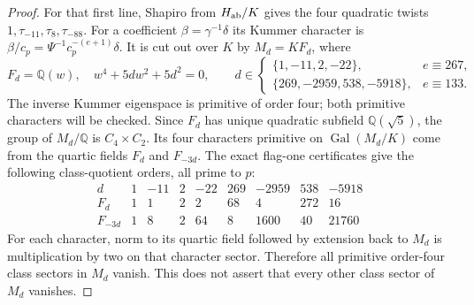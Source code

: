 \begin{proof}
For that first line, Shapiro from $H_{\rm ab}/K$ gives the four
quadratic twists $1,\tau_{-11},\tau_8,\tau_{-88}$.
For a coefficient $\beta=\gamma^{-1}\delta$ its Kummer character
is $\beta/c_p=\Psi^{-1}c_p^{-(e+1)}\delta$.
It is cut out over $K$ by $M_d=KF_d$, where
\[
 F_d=\mathbb Q(w),\quad w^4+5dw^2+5d^2=0,\qquad
 d\in\begin{cases}
 \{1,-11,2,-22\},&e\equiv267,\\
 \{269,-2959,538,-5918\},&e\equiv133.
 \end{cases} \tag{G140.17}
\]
The inverse Kummer eigenspace is primitive of order four;
both primitive characters will be checked.  Since $F_d$ has
unique quadratic subfield $\mathbb Q(\sqrt5)$, the group of
$M_d/\mathbb Q$ is $C_4\times C_2$.
Its four characters primitive on $\operatorname{Gal}(M_d/K)$
come from the quartic fields $F_d$ and $F_{-3d}$.
The exact flag-one certificates give the following class-quotient
orders, all prime to $p$:
\[
\begin{array}{c|rrrrrrrr}
d&1&-11&2&-22&269&-2959&538&-5918\\\hline
F_d&1&1&2&2&68&4&272&16\\
F_{-3d}&1&8&2&64&8&1600&40&21760
\end{array} \tag{G140.18}
\]
For each character, norm to its quartic field followed by extension
back to $M_d$ is multiplication by two on that character
sector.  Therefore all primitive order-four class sectors in
$M_d$ vanish.  This does not assert that every other class
sector of $M_d$ vanishes.


\end{proof}
